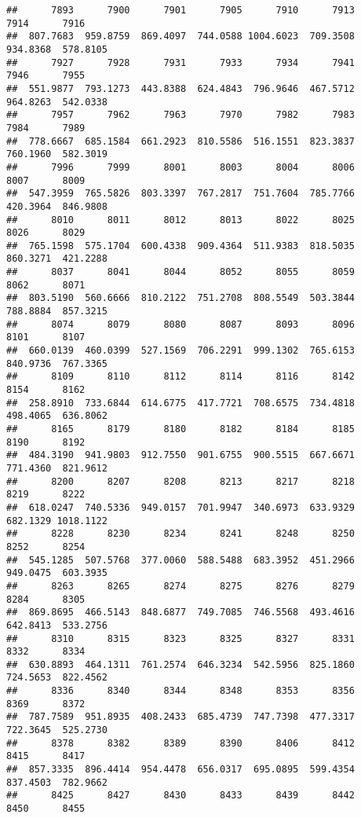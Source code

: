 \documentclass[
]{article}
\begin{document}
\begin{verbatim}
##      7893      7900      7901      7905      7910      7913      7914      7916 
##  807.7683  959.8759  869.4097  744.0588 1004.6023  709.3508  934.8368  578.8105 
##      7927      7928      7931      7933      7934      7941      7946      7955 
##  551.9877  793.1273  443.8388  624.4843  796.9646  467.5712  964.8263  542.0338 
##      7957      7962      7963      7970      7982      7983      7984      7989 
##  778.6667  685.1584  661.2923  810.5586  516.1551  823.3837  760.1960  582.3019 
##      7996      7999      8001      8003      8004      8006      8007      8009 
##  547.3959  765.5826  803.3397  767.2817  751.7604  785.7766  420.3964  846.9808 
##      8010      8011      8012      8013      8022      8025      8026      8029 
##  765.1598  575.1704  600.4338  909.4364  511.9383  818.5035  860.3271  421.2288 
##      8037      8041      8044      8052      8055      8059      8062      8071 
##  803.5190  560.6666  810.2122  751.2708  808.5549  503.3844  788.8884  857.3215 
##      8074      8079      8080      8087      8093      8096      8101      8107 
##  660.0139  460.0399  527.1569  706.2291  999.1302  765.6153  840.9736  767.3365 
##      8109      8110      8112      8114      8116      8142      8154      8162 
##  258.8910  733.6844  614.6775  417.7721  708.6575  734.4818  498.4065  636.8062 
##      8165      8179      8180      8182      8184      8185      8190      8192 
##  484.3190  941.9803  912.7550  901.6755  900.5515  667.6671  771.4360  821.9612 
##      8200      8207      8208      8213      8217      8218      8219      8222 
##  618.0247  740.5336  949.0157  701.9947  340.6973  633.9329  682.1329 1018.1122 
##      8228      8230      8234      8241      8248      8250      8252      8254 
##  545.1285  507.5768  377.0060  588.5488  683.3952  451.2966  949.0475  603.3935 
##      8263      8265      8274      8275      8276      8279      8284      8305 
##  869.8695  466.5143  848.6877  749.7085  746.5568  493.4616  642.8413  533.2756 
##      8310      8315      8323      8325      8327      8331      8332      8334 
##  630.8893  464.1311  761.2574  646.3234  542.5956  825.1860  724.5653  822.4562 
##      8336      8340      8344      8348      8353      8356      8369      8372 
##  787.7589  951.8935  408.2433  685.4739  747.7398  477.3317  722.3645  525.2730 
##      8378      8382      8389      8390      8406      8412      8415      8417 
##  857.3335  896.4414  954.4478  656.0317  695.0895  599.4354  837.4503  782.9662 
##      8425      8427      8430      8433      8439      8442      8450      8455 

\end{verbatim}
\end{document}
